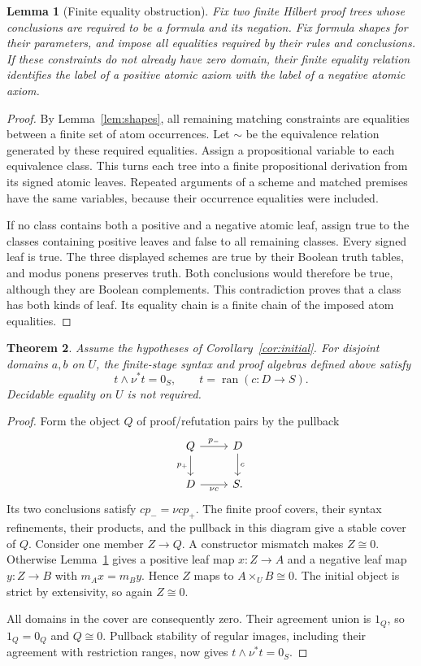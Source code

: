 \documentclass[11pt]{article}
\newtheorem{theorem}{Theorem}[section]
\newtheorem{lemma}[theorem]{Lemma}
\theoremstyle{definition}\newtheorem{definition}[theorem]{Definition}
\theoremstyle{remark}\newtheorem{remark}[theorem]{Remark}
\newcommand{\ran}{\operatorname{ran}}
\begin{document}
\begin{lemma}[Finite equality obstruction]\label{lem:finite-obstruction}
Fix two finite Hilbert proof trees whose conclusions are required
to be a formula and its negation. Fix formula shapes for their
parameters, and impose all equalities required by their rules and
conclusions. If these constraints do not already have zero domain,
their finite equality relation identifies the label of a positive
atomic axiom with the label of a negative atomic axiom.
\end{lemma}
\begin{proof}
By Lemma~\ref{lem:shapes}, all remaining matching constraints are
equalities between a finite set of atom occurrences. Let \(\sim\)
be the equivalence relation generated by these required equalities.
Assign a propositional variable to each equivalence class. This
turns each tree into a finite propositional derivation from its
signed atomic leaves. Repeated arguments of a scheme and matched
premises have the same variables, because their occurrence
equalities were included.

If no class contains both a positive and a negative atomic leaf,
assign true to the classes containing positive leaves and false to
all remaining classes. Every signed leaf is true. The three
displayed schemes are true by their Boolean truth tables, and
modus ponens preserves truth. Both conclusions would therefore
be true, although they are Boolean complements. This contradiction
proves that a class has both kinds of leaf. Its equality chain is
a finite chain of the imposed atom equalities.
\end{proof}

\begin{theorem}\label{thm:consistency}
Assume the hypotheses of Corollary~\ref{cor:initial}. For disjoint
domains \(a,b\) on \(U\), the finite-stage syntax and proof algebras
defined above satisfy
\[
 t\wedge\nu^*t=0_S,\qquad t=\ran(c:D\to S).
\]
Decidable equality on \(U\) is not required.
\end{theorem}
\begin{proof}
Form the object \(Q\) of proof/refutation pairs by the pullback
\[
\begin{tikzcd}
 Q\arrow[r,"p_-"]\arrow[d,"p_+"']&D\arrow[d,"c"]\\
 D\arrow[r,"\nu c"']&S.
\end{tikzcd}
\]
Its two conclusions satisfy \(cp_-=\nu cp_+\).
The finite proof covers, their syntax refinements, their products,
and the pullback in this diagram give a stable cover of \(Q\).
Consider one member \(Z\to Q\). A constructor mismatch makes
\(Z\cong0\). Otherwise Lemma~\ref{lem:finite-obstruction} gives
a positive leaf map \(x:Z\to A\) and a negative leaf map
\(y:Z\to B\) with \(m_Ax=m_By\). Hence \(Z\) maps to
\(A\times_U B\cong0\). The initial object is strict by
extensivity, so again \(Z\cong0\).

All domains in the cover are consequently zero. Their agreement
union is \(1_Q\), so \(1_Q=0_Q\) and \(Q\cong0\).
Pullback stability of regular images, including their agreement
with restriction ranges, now gives \(t\wedge\nu^*t=0_S\).
\end{proof}
\end{document}
